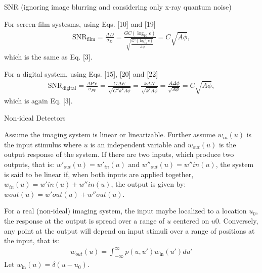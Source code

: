 \documentclass[mphy386-notes.tex]{subfiles}
\begin{document}
SNR (ignoring image blurring and considering only x-ray quantum noise)

For screen-film systesms, using Eqs. [10] and [19]
\begin{align}
  \text{SNR}_{\text{film}} = \frac{\Delta D}{\sigma_D} = \frac{GC(\log_{10}e)}{\sqrt{\frac{G^2(\log_{10}^2e)}{A\bar{\phi}}}} = C\sqrt{A\bar{\phi}},
\end{align}
which is the same as Eq. [3]. 

For a digital system, using Eqs. [15], [20] and [22]
\begin{align}
  \text{SNR}_{\text{digital}} = \frac{\Delta \text{PV}}{\sigma_{PV}} = \frac{G\Delta E}{\sqrt{G^2 k^2 A\phi}} = \frac{k\Delta N}{\sqrt{k^2 A\phi}} = \frac{A\Delta \phi}{\sqrt{A\phi}} = C\sqrt{A\bar{\phi}},
\end{align}
which is again Eq. [3].

Non-ideal Detectors

Assume the imaging system is linear or linearizable. Further assume $w_{in}(u)$
is the input stimulus where $u$ is an independent variable and $w_{out}(u)$ is
the output response of the system. If there are two inputs, which produce two
outputs, that is: $w'_{out}(u) = w'_{in}(u)$ and $w''_{out}(u) = w''in(u)$, the
system is said to be linear if, when both inputs are applied together, $w_{in}(u) =
w'in(u) + w''in(u)$, the output is given by: $wout(u) = w'out(u) + w''out(u)$.

For a real (non-ideal) imaging system, the input maybe localized to a location
$u_0$, the response at the output is spread over a range of $u$ centered on
$u0$. Conversely, any point at the output will depend on input stimuli over a
range of positions at the input, that is:
\begin{align*}
  w_{out}(u) = \int_{-\infty}^{\infty} p(u, u') w_{\text{in}}(u')du'
\end{align*}
Let $w_{\text{in}}(u) = \delta(u - u_0)$.
\newpage
\end{document}
